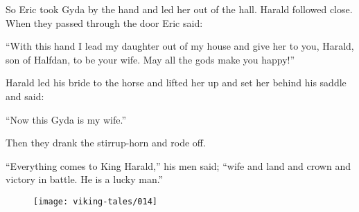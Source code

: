 So Eric took Gyda by the hand and led her out of the hall. Harald
followed close. When they passed through the door Eric said:

``With this hand I lead my daughter out of my house and give her to you,
Harald, son of Halfdan, to be your wife. May all the gods make you
happy!''

Harald led his bride to the horse and lifted her up and set her behind
his saddle and said:

``Now this Gyda is my wife.''

Then they drank the stirrup-horn and rode off.

``Everything comes to King Harald,'' his men said; ``wife and land and
crown and victory in battle. He is a lucky man.''

\begin{figure}[hb]
    \centering
    \vskip8pt
    \texttt{[image: viking-tales/014]}
\end{figure}
